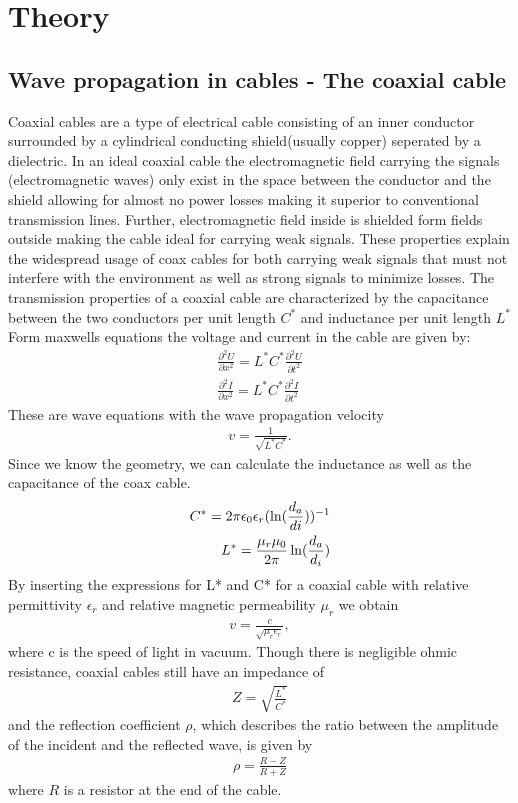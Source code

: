 \documentclass[a4paper,10pt,twocolumn]{article}
\begin{document}
    \section{Theory}
    \subsection{Wave propagation in cables - The coaxial cable}
    Coaxial cables are a type of electrical cable consisting of an inner conductor surrounded by a cylindrical conducting shield(usually copper) seperated by a dielectric. In an ideal coaxial
    cable the electromagnetic field carrying the signals (electromagnetic waves) only exist in the space between the conductor and the shield allowing for almost no power losses making it superior to conventional
    transmission lines. 
    Further, electromagnetic field inside is shielded form fields outside making the cable ideal for carrying weak signals.
    These properties explain the widespread usage of coax cables for both carrying weak signals that must not interfere with the environment as well as strong signals to minimize losses.
    The transmission properties of a coaxial cable are characterized by the capacitance between the two conductors per unit length $C^*$ and inductance per unit length $L^*$
    Form maxwells equations the voltage and current in the cable are given by:
    \begin{align*}
        \frac{\partial^2U}{\partial x^2}=L^*C^*\frac{\partial^2U}{\partial t^2}\\
        \frac{\partial^2I}{\partial x^2}=L^*C^*\frac{\partial^2I}{\partial t^2}
    \end{align*}
    These are wave equations with the wave propagation velocity
    \begin{align}
        \label{coaxial:vel}
        v = \frac{1}{\sqrt{L^*C^*}}.
    \end{align}
    Since we know the geometry, we can calculate the inductance as well as the capacitance of the coax cable.
    \begin{align}
        C^* = 2\pi\epsilon_0\epsilon_r (\ln(\frac{d_a}{di}))^{-1}\endline
        L^* = \frac{\mu_r\mu_0}{2\pi}\ln(\frac{d_a}{d_i})
        \end{align}
    By inserting the expressions for L* and C* for a coaxial cable with relative permittivity $\epsilon_r$ and relative magnetic permeability $\mu_r$ we obtain
    \begin{align}
        \label{eq:vavePropagationVelocity}
        v = \frac{c}{\sqrt{\mu_r\epsilon_r}},
    \end{align}
    where c is the speed of light in vacuum.
    Though there is negligible ohmic resistance, coaxial cables still have an impedance of
    \begin{align}
        Z=\sqrt{\frac{L^*}{C^*}}
    \end{align}
    and the reflection coefficient $\rho$, which describes the ratio between the amplitude of the incident and the reflected wave, is given by
    \begin{align}
        \label{eq:coaxRef}
        \rho=\frac{R-Z}{R+Z}
    \end{align}
    where $R$ is a resistor at the end of the cable.
\end{document}
